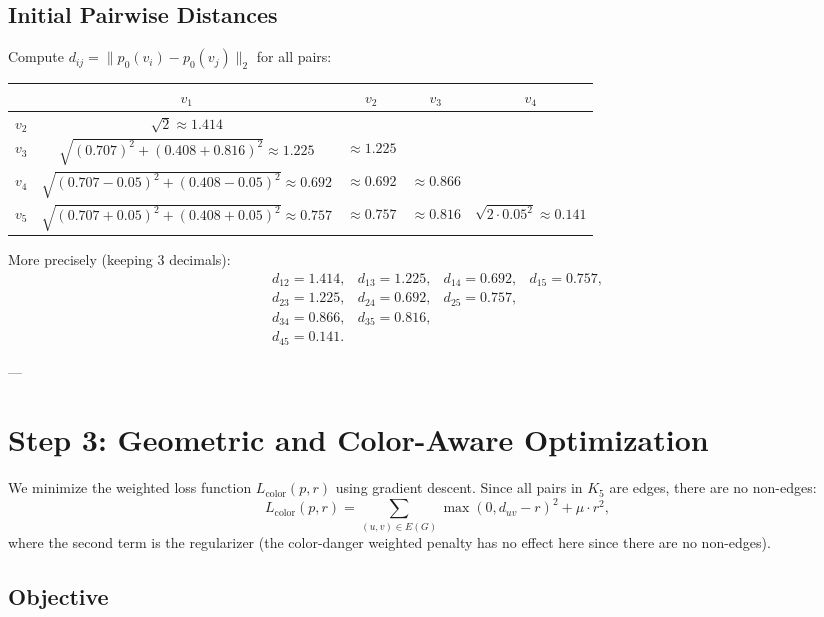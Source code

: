 \documentclass[11pt]{article}
\theoremstyle{definition}
\begin{document}
\subsection{Initial Pairwise Distances}

Compute $d_{ij} = \|p_0(v_i) - p_0(v_j)\|_2$ for all pairs:

\begin{center}
\begin{tabular}{ccccc}
\toprule
& $v_1$ & $v_2$ & $v_3$ & $v_4$ \\
\midrule
$v_2$ & $\sqrt{2} \approx 1.414$ & & & \\
$v_3$ & $\sqrt{(0.707)^2 + (0.408 + 0.816)^2} \approx 1.225$ & $\approx 1.225$ & & \\
$v_4$ & $\sqrt{(0.707-0.05)^2 + (0.408-0.05)^2} \approx 0.692$ & $\approx 0.692$ & $\approx 0.866$ & \\
$v_5$ & $\sqrt{(0.707+0.05)^2 + (0.408+0.05)^2} \approx 0.757$ & $\approx 0.757$ & $\approx 0.816$ & $\sqrt{2 \cdot 0.05^2} \approx 0.141$ \\
\toprule
\end{tabular}
\end{center}

More precisely (keeping 3 decimals):
\[
\begin{array}{cccccc}
d_{12} = 1.414, & d_{13} = 1.225, & d_{14} = 0.692, & d_{15} = 0.757,\\
d_{23} = 1.225, & d_{24} = 0.692, & d_{25} = 0.757,\\
d_{34} = 0.866, & d_{35} = 0.816,\\
d_{45} = 0.141.
\end{array}
\]

---

\section{Step 3: Geometric and Color-Aware Optimization}

We minimize the weighted loss function $L_{\mathrm{color}}(p, r)$ using gradient descent. Since all pairs in $K_5$ are edges, there are no non-edges:
\[
L_{\mathrm{color}}(p,r) = \sum_{(u,v)\in E(G)} \max(0, d_{uv} - r)^2 + \mu \cdot r^2,
\]
where the second term is the regularizer (the color-danger weighted penalty has no effect here since there are no non-edges).

\subsection{Objective}
\end{document}
